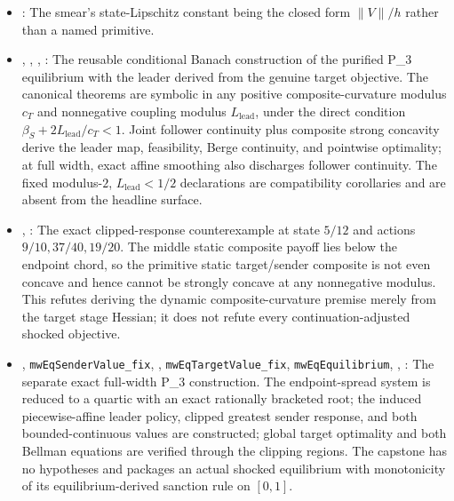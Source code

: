 \begin{itemize}[leftmargin=1.4em,itemsep=1pt]
\item {}: The smear's state-Lipschitz constant being the closed form $\|V\|/h$ rather than a named primitive.
\item {}, , , : The reusable conditional Banach construction of the purified P\_3 equilibrium with the leader derived from the genuine target objective. The canonical theorems are symbolic in any positive composite-curvature modulus \(c_T\) and nonnegative coupling modulus \(L_{\mathrm{lead}}\), under the direct condition \(\beta_S+2L_{\mathrm{lead}}/c_T<1\). Joint follower continuity plus composite strong concavity derive the leader map, feasibility, Berge continuity, and pointwise optimality; at full width, exact affine smoothing also discharges follower continuity. The fixed modulus-\(2\), \(L_{\mathrm{lead}}<1/2\) declarations are compatibility corollaries and are absent from the headline surface.
\item {}, : The exact clipped-response counterexample at state \(5/12\) and actions \(9/10,37/40,19/20\). The middle static composite payoff lies below the endpoint chord, so the primitive static target/sender composite is not even concave and hence cannot be strongly concave at any nonnegative modulus. This refutes deriving the dynamic composite-curvature premise merely from the target stage Hessian; it does not refute every continuation-adjusted shocked objective.
\item {}, \texttt{mwEqSenderValue\_fix}, , \texttt{mwEqTargetValue\_fix}, \texttt{mwEqEquilibrium}, , : The separate exact full-width P\_3 construction. The endpoint-spread system is reduced to a quartic with an exact rationally bracketed root; the induced piecewise-affine leader policy, clipped greatest sender response, and both bounded-continuous values are constructed; global target optimality and both Bellman equations are verified through the clipping regions. The capstone has no hypotheses and packages an actual shocked equilibrium with monotonicity of its equilibrium-derived sanction rule on $[0,1]$.

\end{itemize}
